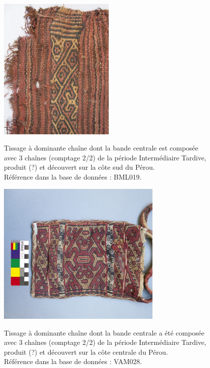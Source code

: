 \begin{figure}[!h]
    \begin{minipage}[c]{.5\linewidth}
            \begin{center}
                \includegraphics[height=7cm]{../images/BML019.jpg}
                 \caption{Tissage à dominante chaîne dont la bande centrale est composée avec 3 chaînes (comptage 2/2) de la période Intermédiaire Tardive, produit (?) et découvert sur la côte sud du Pérou. \\ Référence dans la base de données : BML019.}
            \end{center}
    \label{fig:BML019}
    \end{minipage}
    \hspace{5pt}
    \begin{minipage}[c]{.5\linewidth}
        \begin{center}
        		\includegraphics[height=7cm]{../images/VAM028.jpg}
		 \caption{Tissage à dominante chaîne dont la bande centrale a été composée avec 3 chaînes (comptage 2/2) de la période Intermédiaire Tardive, produit (?) et découvert sur la côte centrale du Pérou.  \\ Référence dans la base de données : VAM028.}
	\end{center}
    \label{fig:VAM028}   
    \end{minipage}
\end{figure}


